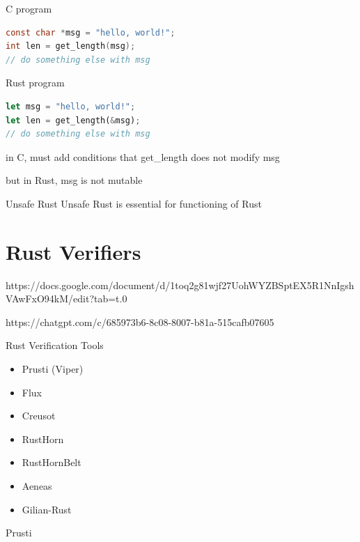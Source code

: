 \documentclass{beamer}
\begin{document}
\begin{frame}[fragile]
\begin{block}{C program}
\begin{lstlisting}[language=C]
const char *msg = "hello, world!"; 
int len = get_length(msg);
// do something else with msg
\end{lstlisting}
\end{block}

\begin{block}{Rust program}
\begin{lstlisting}[language=rust]
let msg = "hello, world!"; 
let len = get_length(&msg);  
// do something else with msg
\end{lstlisting}
\end{block}


in C, must add conditions that get\_length does not modify 
msg

but in Rust, msg is not mutable
\end{frame}

\begin{frame}{Unsafe Rust} 
Unsafe Rust is essential for functioning of Rust 

\end{frame} 

\section{Rust Verifiers}

https://docs.google.com/document/d/1toq2g81wjf27UohWYZBSptEX5R1NnIgshVAwFxO94kM/edit?tab=t.0

https://chatgpt.com/c/685973b6-8c08-8007-b81a-515cafb07605

\begin{frame}{Rust Verification Tools}
\begin{itemize} 
\item Prusti (Viper)
\item Flux
\item Creusot
\item RustHorn
\item RustHornBelt
\item Aeneas
\item Gilian-Rust
\end{itemize} 
\end{frame}

\begin{frame}{Prusti} 

\end{frame}
\end{document}
